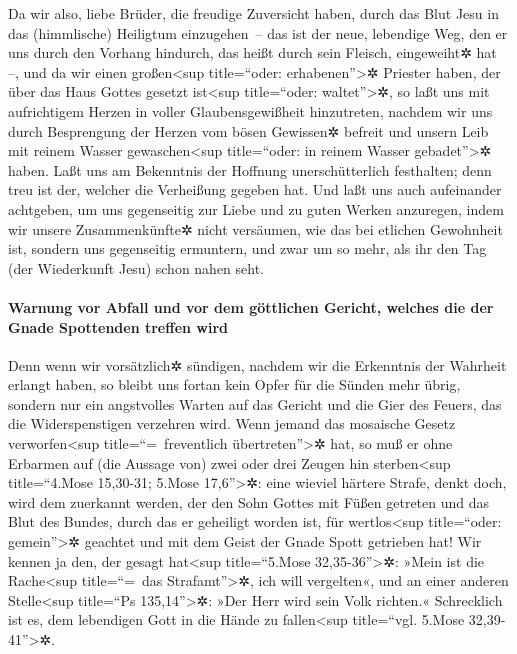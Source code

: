  Da wir also, liebe Brüder, die freudige Zuversicht
haben, durch das Blut Jesu in das (himmlische) Heiligtum einzugehen~--
 das ist der neue, lebendige Weg, den er uns durch den
Vorhang hindurch, das heißt durch sein Fleisch, eingeweiht✲ hat --,
 und da wir einen großen\textless sup title=``oder:
erhabenen''\textgreater✲ Priester haben, der über das Haus Gottes
gesetzt ist\textless sup title=``oder: waltet''\textgreater✲,
 so laßt uns mit aufrichtigem Herzen in voller
Glaubensgewißheit hinzutreten, nachdem wir uns durch Besprengung der
Herzen vom bösen Gewissen✲ befreit und unsern Leib mit reinem Wasser
gewaschen\textless sup title=``oder: in reinem Wasser
gebadet''\textgreater✲ haben.  Laßt uns am Bekenntnis der
Hoffnung unerschütterlich festhalten; denn treu ist der, welcher die
Verheißung gegeben hat.  Und laßt uns auch aufeinander
achtgeben, um uns gegenseitig zur Liebe und zu guten Werken anzuregen,
 indem wir unsere Zusammenkünfte✲ nicht versäumen, wie
das bei etlichen Gewohnheit ist, sondern uns gegenseitig ermuntern, und
zwar um so mehr, als ihr den Tag (der Wiederkunft Jesu) schon nahen
seht.

\hypertarget{warnung-vor-abfall-und-vor-dem-guxf6ttlichen-gericht-welches-die-der-gnade-spottenden-treffen-wird}{%
\paragraph{Warnung vor Abfall und vor dem göttlichen Gericht, welches
die der Gnade Spottenden treffen
wird}\label{warnung-vor-abfall-und-vor-dem-guxf6ttlichen-gericht-welches-die-der-gnade-spottenden-treffen-wird}}

 Denn wenn wir vorsätzlich✲ sündigen, nachdem wir die
Erkenntnis der Wahrheit erlangt haben, so bleibt uns fortan kein Opfer
für die Sünden mehr übrig,  sondern nur ein angstvolles
Warten auf das Gericht und die Gier des Feuers, das die Widerspenstigen
verzehren wird.  Wenn jemand das mosaische Gesetz
verworfen\textless sup title=``=~freventlich übertreten''\textgreater✲
hat, so muß er ohne Erbarmen auf (die Aussage von) zwei oder drei Zeugen
hin sterben\textless sup title=``4.Mose 15,30-31; 5.Mose
17,6''\textgreater✲:  eine wieviel härtere Strafe, denkt
doch, wird dem zuerkannt werden, der den Sohn Gottes mit Füßen getreten
und das Blut des Bundes, durch das er geheiligt worden ist, für
wertlos\textless sup title=``oder: gemein''\textgreater✲ geachtet und
mit dem Geist der Gnade Spott getrieben hat!  Wir kennen
ja den, der gesagt hat\textless sup title=``5.Mose
32,35-36''\textgreater✲: »Mein ist die Rache\textless sup title=``=~das
Strafamt''\textgreater✲, ich will vergelten«, und an einer anderen
Stelle\textless sup title=``Ps 135,14''\textgreater✲: »Der Herr wird
sein Volk richten.«  Schrecklich ist es, dem lebendigen
Gott in die Hände zu fallen\textless sup title=``vgl. 5.Mose
32,39-41''\textgreater✲.


